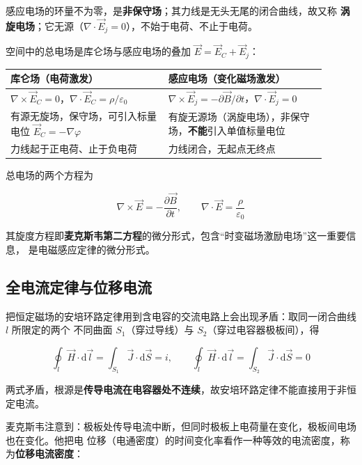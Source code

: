 感应电场的环量不为零，是\textbf{非保守场}；其力线是无头无尾的闭合曲线，故又称
\textbf{涡旋电场}；它无源（$\nabla\cdot\vec{E}_j=0$），不始于电荷、不止于电荷。

空间中的总电场是库仑场与感应电场的叠加 $\vec{E}=\vec{E}_C+\vec{E}_j$：

\begin{center}
\begin{tabular}{@{}>{\raggedright\arraybackslash}p{0.45\linewidth}
>{\raggedright\arraybackslash}p{0.45\linewidth}@{}}
\toprule
\textbf{库仑场（电荷激发）} & \textbf{感应电场（变化磁场激发）} \\
\midrule
$\nabla\times \vec{E}_C=0$，$\nabla\cdot \vec{E}_C=\rho/\varepsilon_0$
& $\nabla\times \vec{E}_j=-\partial \vec{B}/\partial t$，$\nabla\cdot \vec{E}_j=0$ \\
有源无旋场，保守场，可引入标量电位 $\vec{E}_C=-\nabla\varphi$
& 有旋无源场（涡旋电场），非保守场，\textbf{不能}引入单值标量电位 \\
力线起于正电荷、止于负电荷 & 力线闭合，无起点无终点 \\
\bottomrule
\end{tabular}
\end{center}

总电场的两个方程为
\begin{formulaBox}
\[
\nabla\times \vec{E}=-\frac{\partial \vec{B}}{\partial t},
\qquad
\nabla\cdot \vec{E}=\frac{\rho}{\varepsilon_0}
\]
\end{formulaBox}
其旋度方程即\textbf{麦克斯韦第二方程}的微分形式，包含“时变磁场激励电场”这一重要信息，
是电磁感应定律的微分形式。

\subsection{全电流定律与位移电流}

把恒定磁场的安培环路定律用到含电容的交流电路上会出现矛盾：取同一闭合曲线 $l$ 所限定的两个
不同曲面 $S_1$（穿过导线）与 $S_2$（穿过电容器极板间），得

\[
\oint_{l}\vec{H}\cdot \mathrm{d}\vec{l}=\int_{S_1}\vec{J}\cdot \mathrm{d}\vec{S}=i,
\qquad
\oint_{l}\vec{H}\cdot \mathrm{d}\vec{l}=\int_{S_2}\vec{J}\cdot \mathrm{d}\vec{S}=0
\]

两式矛盾，根源是\textbf{传导电流在电容器处不连续}，故安培环路定律不能直接用于非恒定电流。

麦克斯韦注意到：极板处传导电流中断，但同时极板上电荷量在变化，极板间电场也在变化。他把电
位移（电通密度）的时间变化率看作一种等效的电流密度，称为\textbf{位移电流密度}：


